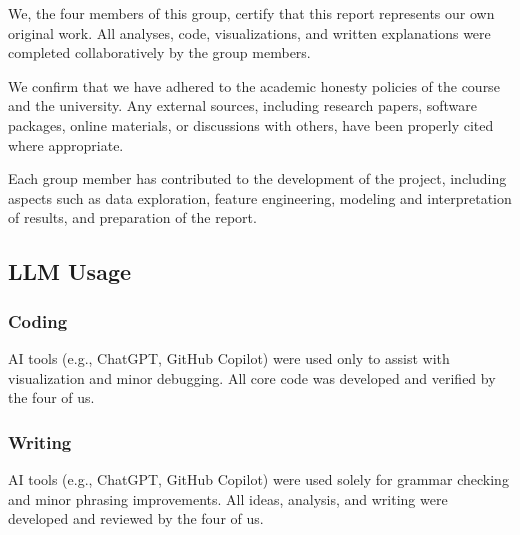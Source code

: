 \documentclass[10pt,letterpaper]{article}
\begin{document}
We, the four members of this group, certify that this report represents our own original work. All analyses, code, visualizations, and written explanations were completed collaboratively by the group members.

We confirm that we have adhered to the academic honesty policies of the course and the university. Any external sources, including research papers, software packages, online materials, or discussions with others, have been properly cited where appropriate. 

Each group member has contributed to the development of the project, including aspects such as data exploration, feature engineering, modeling and interpretation of results, and preparation of the report.
\subsection{LLM Usage}

\subsubsection*{Coding}



AI tools (e.g., ChatGPT, GitHub Copilot) were used only to assist with visualization and minor debugging. All core code was developed and verified by the four of us.


\subsubsection*{Writing}

AI tools (e.g., ChatGPT, GitHub Copilot) were used solely for grammar checking and minor phrasing improvements. All ideas, analysis, and writing were developed and reviewed by the four of us.
\end{document}
